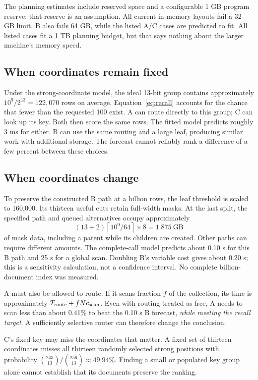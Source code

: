 \documentclass[11pt,a4paper]{article}
\newcommand{\ceil}[1]{\left\lceil #1\right\rceil}
\begin{document}
The planning estimates include reserved space and a configurable 1 GB program reserve;
that reserve is an assumption. All current in-memory layouts fail a 32 GB limit. B also
fails 64 GB, while the listed A/C cases are predicted to fit. All listed cases fit a 1 TB
planning budget, but that says nothing about the larger machine's memory speed.

\subsection{When coordinates remain fixed}
Under the strong-coordinate model, the ideal 13-bit group contains approximately
$10^9/2^{13}=122{,}070$ rows on average. Equation~\ref{eq:recall} accounts for the chance that
fewer than the requested 100 exist. A can route directly to this group; C can look up its
key. Both then score the same rows. The fitted model predicts roughly 3 ms for either.
B can use the same routing and a large leaf, producing similar work with additional storage.
The forecast cannot reliably rank a difference of a few percent between these choices.

\subsection{When coordinates change}
To preserve the constructed B path at a billion rows, the leaf threshold is scaled to
160,000. Its thirteen useful cuts retain full-width masks. At the last split, the specified
path and queued alternatives occupy approximately
\[
 (13+2)\ceil{10^9/64}\times8=1.875\ \text{GB}
\]
of mask data, including a parent while its children are created. Other paths can require
different amounts. The complete-call model predicts about 0.10 s for this B path and 25 s
for a global scan. Doubling B's variable cost gives about 0.20 s; this is a sensitivity
calculation, not a confidence interval. No complete billion-document index was measured.

A must also be allowed to route. If it scans fraction $f$ of the collection, its time is
approximately $T_{\rm route}+fNc_{\rm scan}$. Even with routing treated as free, A needs to
scan less than about 0.41\% to beat the 0.10 s B forecast, \emph{while meeting the recall
target}. A sufficiently selective router can therefore change the conclusion.

C's fixed key may miss the coordinates that matter. A fixed set of thirteen coordinates
misses all thirteen randomly selected strong positions with probability
$\binom{243}{13}/\binom{256}{13}\approx49.94\%$. Finding a small or populated key group alone
cannot establish that its documents preserve the ranking.
\end{document}
